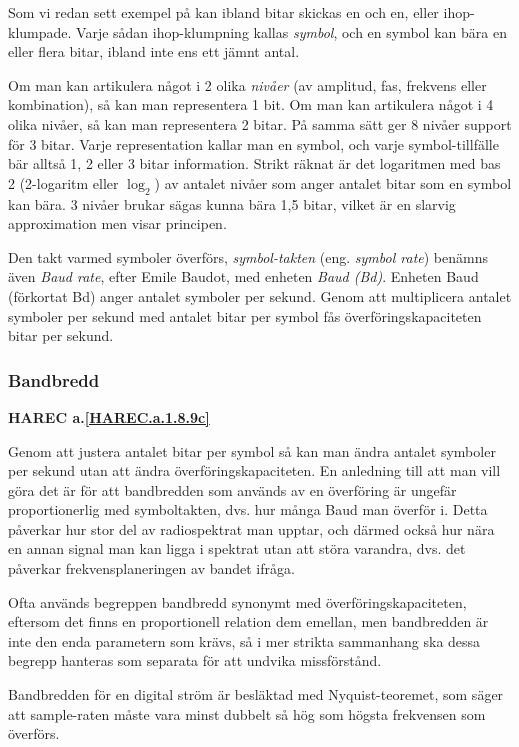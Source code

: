 Som vi redan sett exempel på kan ibland bitar skickas en och en, eller
ihop-klumpade. Varje sådan ihop-klumpning kallas \emph{symbol}, och en symbol
kan bära en eller flera bitar, ibland inte ens ett jämnt antal.

Om man kan artikulera något i 2 olika \emph{nivåer} (av amplitud, fas, frekvens
eller kombination), så kan man representera 1 bit. Om man kan artikulera något
i 4 olika nivåer, så kan man representera 2 bitar. På samma sätt ger 8 nivåer
support för 3 bitar. Varje representation kallar man en symbol, och varje
symbol-tillfälle bär alltså 1, 2 eller 3 bitar information. Strikt räknat
är det logaritmen med bas 2 (2-logaritm eller $\log_{2}$) av antalet nivåer som
anger antalet bitar som en symbol kan bära. 3 nivåer brukar sägas kunna bära
1,5 bitar, vilket är en slarvig approximation men visar principen.

Den takt varmed symboler överförs, \emph{symbol-takten} (eng. \emph{symbol rate})
benämns även \emph{Baud rate}, efter Emile Baudot, med enheten \emph{Baud (Bd)}.
Enheten Baud (förkortat Bd) anger antalet symboler per sekund. Genom att
multiplicera antalet symboler per sekund med antalet bitar per symbol fås
överföringskapaciteten bitar per sekund.

\subsubsection{Bandbredd}
\textbf{HAREC a.\ref{HAREC.a.1.8.9c}\label{myHAREC.a.1.8.9c}}

Genom att justera antalet bitar per symbol så kan man ändra antalet symboler
per sekund utan att ändra överföringskapaciteten. En anledning till att man
vill göra det är för att bandbredden som används av en överföring är ungefär
proportionerlig med symboltakten, dvs. hur många Baud man överför i.
Detta påverkar hur stor del av radiospektrat man upptar, och därmed också hur
nära en annan signal man kan ligga i spektrat utan att störa varandra, dvs.
det påverkar frekvensplaneringen av bandet ifråga.

Ofta används begreppen bandbredd synonymt med överföringskapaciteten, eftersom
det finns en proportionell relation dem emellan, men bandbredden är inte den
enda parametern som krävs, så i mer strikta sammanhang ska dessa begrepp
hanteras som separata för att undvika missförstånd.

Bandbredden för en digital ström är besläktad med Nyquist-teoremet, som säger
att sample-raten måste vara minst dubbelt så hög som högsta frekvensen som
överförs.

